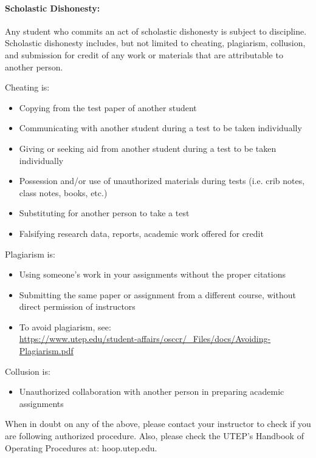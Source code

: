 \documentclass[12pt]{scrartcl}
\begin{document}
\paragraph{Scholastic Dishonesty: }
Any student who commits an act of scholastic dishonesty is subject to discipline. Scholastic dishonesty includes, but not limited to cheating, plagiarism, collusion, and submission for credit of any work or materials that are attributable to another person.

Cheating is:
\begin{itemize}
\item Copying from the test paper of another student
\item Communicating with another student during a test to be taken individually
\item Giving or seeking aid from another student during a test to be taken individually
\item Possession and/or use of unauthorized materials during tests (i.e. crib notes, class notes, books, etc.)
\item Substituting for another person to take a test
\item Falsifying research data, reports, academic work offered for credit
\end{itemize}

Plagiarism is:
\begin{itemize}
\item Using someone’s work in your assignments without the proper citations
\item Submitting the same paper or assignment from a different course, without direct permission of instructors
\item[]\vspace{1em} To avoid plagiarism, see: \\{\footnotesize\url{https://www.utep.edu/student-affairs/osccr/_Files/docs/Avoiding-Plagiarism.pdf}}
\end{itemize}
                               
Collusion is:
\begin{itemize}
\item Unauthorized collaboration with another person in preparing academic assignments
\end{itemize}

\begin{tcolorbox}[colback=red!5,colframe=red!75!black,title=Important!]
When in doubt on any of the above, please contact your instructor to check if you are following authorized procedure. Also, please check the UTEP’s Handbook of Operating Procedures at: hoop.utep.edu. 
\end{tcolorbox}

\end{document}
